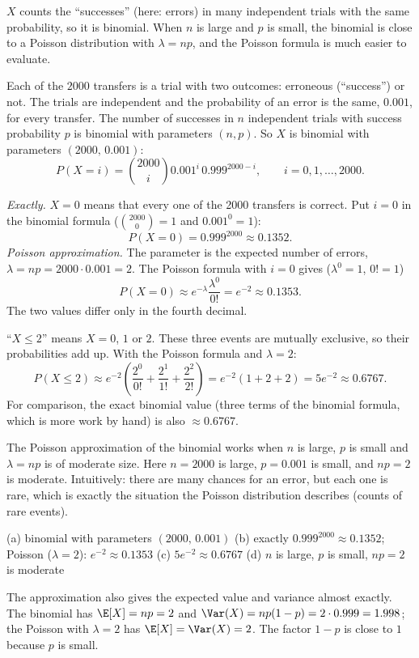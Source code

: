 \begin{solution}
	\idea $X$ counts the ``successes'' (here: errors) in many independent trials
	with the same probability, so it is binomial. When $n$ is large and $p$ is
	small, the binomial is close to a Poisson distribution with $\lambda=np$,
	and the Poisson formula is much easier to evaluate.

	 Each of the $2000$ transfers is a trial with two outcomes:
	erroneous (``success'') or not. The trials are independent and the
	probability of an error is the same, $0.001$, for every transfer. The number
	of successes in $n$ independent trials with success probability $p$ is
	binomial with parameters $(n,p)$. So $X$ is binomial with parameters
	$(2000,\,0.001)$:
	\[
		P(X=i)=\binom{2000}{i}0.001^i\,0.999^{2000-i},\qquad i=0,1,\dots,2000.
	\]

	 \emph{Exactly.} $X=0$ means that every one of the 2000 transfers
	is correct. Put $i=0$ in the binomial formula ($\binom{2000}{0}=1$ and
	$0.001^0=1$):
	\[
		P(X=0)=0.999^{2000}\approx 0.1352.
	\]
	\emph{Poisson approximation.} The parameter is the expected number of
	errors, $\lambda=np=2000\cdot0.001=2$. The Poisson formula with $i=0$
	gives ($\lambda^0=1$, $0!=1$)
	\[
		P(X=0)\approx e^{-\lambda}\frac{\lambda^0}{0!}=e^{-2}\approx 0.1353.
	\]
	The two values differ only in the fourth decimal.

	 ``$X\le2$'' means $X=0$, $1$ or $2$. These three events are
	mutually exclusive, so their probabilities add up. With the Poisson formula
	and $\lambda=2$:
	\[
		P(X\le 2)\approx e^{-2}\left(\frac{2^0}{0!}+\frac{2^1}{1!}+\frac{2^2}{2!}\right)
		=e^{-2}(1+2+2)=5e^{-2}\approx 0.6767.
	\]
	For comparison, the exact binomial value (three terms of the binomial
	formula, which is more work by hand) is also $\approx0.6767$.

	 The Poisson approximation of the binomial works when $n$ is large,
	$p$ is small and $\lambda=np$ is of moderate size. Here $n=2000$ is large,
	$p=0.001$ is small, and $np=2$ is moderate. Intuitively: there are many
	chances for an error, but each one is rare, which is exactly the situation
	the Poisson distribution describes (counts of rare events).

	\begin{answer}
		(a) binomial with parameters $(2000,\,0.001)$ \quad
		(b) exactly $0.999^{2000}\approx0.1352$; Poisson ($\lambda=2$):
		$e^{-2}\approx0.1353$ \quad
		(c) $5e^{-2}\approx0.6767$ \quad
		(d) $n$ is large, $p$ is small, $np=2$ is moderate
	\end{answer}
	\begin{remark}
		The approximation also gives the expected value and variance almost
		exactly. The binomial has $\E[X]=np=2$ and
		$\Var(X)=np(1-p)=2\cdot0.999=1.998$; the Poisson with $\lambda=2$ has
		$\E[X]=\Var(X)=2$. The factor $1-p$ is close to $1$ because $p$ is small.
	\end{remark}
\end{solution}
